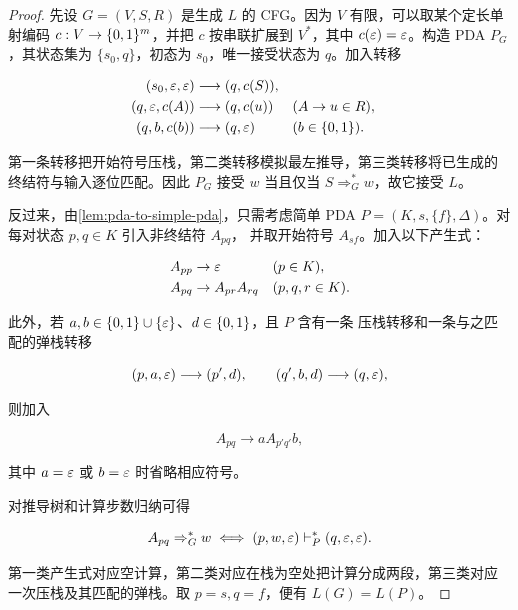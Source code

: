 \begin{proof}
  先设 $G=(V,S,R)$ 是生成 $L$ 的 CFG。因为 $V$ 有限，可以取某个定长单射编码
  $c:V\to\{0,1\}^m$，并把 $c$ 按串联扩展到 $V^*$，其中
  $c(\varepsilon)=\varepsilon$。构造 PDA $P_G$，其状态集为 $\{s_0,q\}$，初态为
  $s_0$，唯一接受状态为 $q$。加入转移

  \begin{align*}
    (s_0,\varepsilon,\varepsilon)&\longrightarrow(q,c(S)),\\
    (q,\varepsilon,c(A))&\longrightarrow(q,c(u))
      &&(A\to u\in R),\\
    (q,b,c(b))&\longrightarrow(q,\varepsilon)
      &&(b\in\{0,1\}).
  \end{align*}

  第一条转移把开始符号压栈，第二类转移模拟最左推导，第三类转移将已生成的
  终结符与输入逐位匹配。因此 $P_G$ 接受 $w$ 当且仅当
  $S\Rightarrow_G^*w$，故它接受 $L$。

  反过来，由\cref{lem:pda-to-simple-pda}，只需考虑简单 PDA
  $P=(K,s,\{f\},\Delta)$。对每对状态 $p,q\in K$ 引入非终结符 $A_{pq}$，
  并取开始符号 $A_{sf}$。加入以下产生式：

  \begin{align*}
    A_{pp}&\to\varepsilon &&(p\in K),\\
    A_{pq}&\to A_{pr}A_{rq} &&(p,q,r\in K).
  \end{align*}

  此外，若 $a,b\in\{0,1\}\cup\{\varepsilon\}$、$d\in\{0,1\}$，且 $P$ 含有一条
  压栈转移和一条与之匹配的弹栈转移

  \[
    (p,a,\varepsilon)\longrightarrow(p',d),
    \qquad
    (q',b,d)\longrightarrow(q,\varepsilon),
  \]

  则加入

  \[
    A_{pq}\to aA_{p'q'}b,
  \]

  其中 $a=\varepsilon$ 或 $b=\varepsilon$ 时省略相应符号。

  对推导树和计算步数归纳可得

  \[
    A_{pq}\Rightarrow_G^*w
    \iff
    (p,w,\varepsilon)\vdash_P^*(q,\varepsilon,\varepsilon).
  \]

  第一类产生式对应空计算，第二类对应在栈为空处把计算分成两段，第三类对应
  一次压栈及其匹配的弹栈。取 $p=s,q=f$，便有 $L(G)=L(P)$。
\end{proof}
